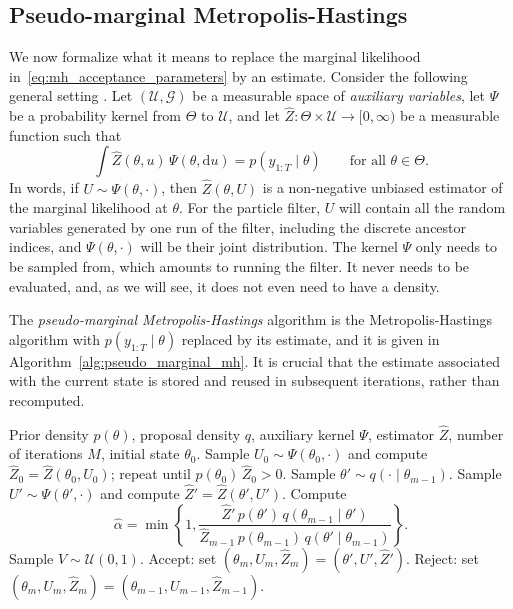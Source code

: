 \subsection{Pseudo-marginal Metropolis-Hastings}
\label{sec:pseudo_marginal_mh}
We now formalize what it means to replace the marginal likelihood in~\eqref{eq:mh_acceptance_parameters} by an estimate. Consider the following general setting \cite{andrieu2009pseudo}. Let $(\mathcal{U},\mathcal{G})$ be a measurable space of \emph{auxiliary variables}, let $\Psi$ be a probability kernel from $\Theta$ to $\mathcal{U}$, and let $\hat{Z}\colon\Theta\times\mathcal{U}\to[0,\infty)$ be a measurable function such that
\begin{equation}
    \int\hat{Z}(\theta,u)\,\Psi(\theta,\mathrm{d}u) = p(y_{1:T}\mid\theta)\qquad\text{for all }\theta\in\Theta.
    \label{eq:pseudo_marginal_unbiased}
\end{equation}
In words, if $U\sim\Psi(\theta,\cdot)$, then $\hat{Z}(\theta,U)$ is a non-negative unbiased estimator of the marginal likelihood at $\theta$. For the particle filter, $U$ will contain all the random variables generated by one run of the filter, including the discrete ancestor indices, and $\Psi(\theta,\cdot)$ will be their joint distribution. The kernel $\Psi$ only needs to be sampled from, which amounts to running the filter. It never needs to be evaluated, and, as we will see, it does not even need to have a density.

The \emph{pseudo-marginal Metropolis-Hastings} algorithm is the Metropolis-Hastings algorithm with $p(y_{1:T}\mid\theta)$ replaced by its estimate, and it is given in Algorithm~\ref{alg:pseudo_marginal_mh}. It is crucial that the estimate associated with the current state is stored and reused in subsequent iterations, rather than recomputed.

\begin{algorithm}[H]
\caption{Pseudo-marginal Metropolis-Hastings}
\label{alg:pseudo_marginal_mh}
\begin{algorithmic}[1]
    \REQUIRE Prior density $p(\theta)$, proposal density $q$, auxiliary kernel $\Psi$, estimator $\hat{Z}$, number of iterations $M$, initial state $\theta_0$.
    \STATE Sample $U_0\sim\Psi(\theta_0,\cdot)$ and compute $\hat{Z}_0 = \hat{Z}(\theta_0,U_0)$; repeat until $p(\theta_0)\,\hat{Z}_0>0$.
        \STATE Sample $\theta'\sim q(\cdot\mid\theta_{m-1})$.
        \STATE Sample $U'\sim\Psi(\theta',\cdot)$ and compute $\hat{Z}' = \hat{Z}(\theta',U')$.
        \STATE Compute
        \begin{equation*}
            \hat{\alpha} = \min\left\{1,\frac{\hat{Z}'\,p(\theta')\,q(\theta_{m-1}\mid\theta')}{\hat{Z}_{m-1}\,p(\theta_{m-1})\,q(\theta'\mid\theta_{m-1})}\right\}.
        \end{equation*}
        \STATE Sample $V\sim\mathcal{U}(0,1)$.
            \STATE Accept: set $(\theta_m,U_m,\hat{Z}_m) = (\theta',U',\hat{Z}')$.
        \ELSE
            \STATE Reject: set $(\theta_m,U_m,\hat{Z}_m) = (\theta_{m-1},U_{m-1},\hat{Z}_{m-1})$.
        \ENDIF
    \ENDFOR
\end{algorithmic}
\end{algorithm}

